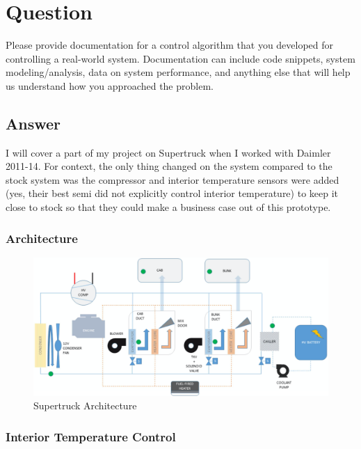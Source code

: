 \section{Question}
Please provide documentation for a control algorithm that you developed for controlling
a real-world system. Documentation can include code snippets, system
modeling/analysis, data on system performance, and anything else that will help us
understand how you approached the problem.

\subsection *{Answer}
I will cover a part of my project on Supertruck when I worked with Daimler 2011-14. For context, the only thing changed on the system compared to the stock system was the compressor and interior temperature sensors were added (yes, their best semi did not explicitly control interior temperature) to keep it close to stock so that they could make a business case out of this prototype.

\subsubsection * {Architecture}

\begin{figure}[h!]
  \includegraphics[width=\textwidth]{supertruck_arch}
  \caption{Supertruck Architecture}
\end{figure}

\subsubsection * {Interior Temperature Control}

